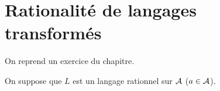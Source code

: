 \newpage
\section{Rationalité de langages transformés}
On reprend un exercice du chapitre.

On suppose que $L$ est un langage rationnel sur ${\cal A}$ ($a\in{\cal A}$).

